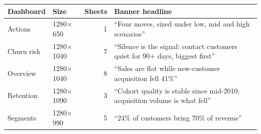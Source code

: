 \begin{tabularx}{\textwidth}{llrX}
\toprule
Dashboard & Size & Sheets & Banner headline \\
\midrule
Actions & 1280$\times$650 & 1 & ``Four moves, sized under low, mid and high scenarios'' \\
Churn risk & 1280$\times$1040 & 7 & ``Silence is the signal: contact customers quiet for 90+ days, biggest first'' \\
Overview & 1280$\times$1040 & 8 & ``Sales are flat while new-customer acquisition fell 41\%'' \\
Retention & 1280$\times$1090 & 3 & ``Cohort quality is stable since mid-2010; acquisition volume is what fell'' \\
Segments & 1280$\times$990 & 5 & ``24\% of customers bring 70\% of revenue'' \\
\bottomrule
\end{tabularx}
